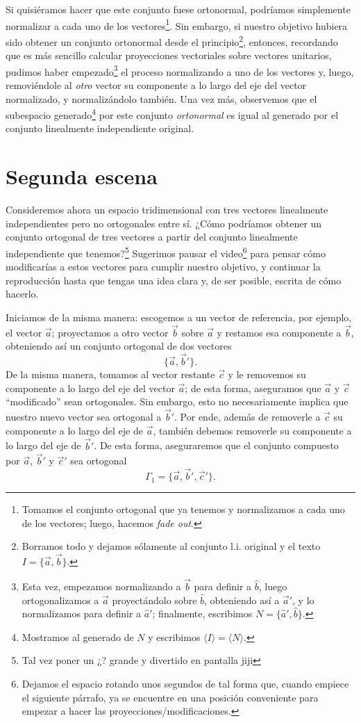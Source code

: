 \documentclass[12pt,dvipsnames]{article}
\numberwithin{equation}{section}
\begin{document}
Si quisiéramos hacer que este conjunto fuese ortonormal, podríamos simplemente normalizar a cada uno de los vectores\footnote{Tomamos el conjunto ortogonal que ya tenemos y normalizamos a cada uno de los vectores; luego, hacemos \emph{fade out}.}. Sin embargo, si nuestro objetivo hubiera sido obtener un conjunto ortonormal desde el principio\footnote{Borramos todo y dejamos sólamente al conjunto l.i. original y el texto $I=\{\vec{a},\vec{b}\}$.}, entonces, recordando que es más sencillo calcular proyecciones vectoriales sobre vectores unitarios, pudimos haber empezado\footnote{Esta vez, empezamos normalizando a $\vec{b}$ para definir a $\hat{b}$, luego ortogonalizamos a $\vec{a}$ proyectándolo sobre $\hat{b}$, obteniendo así a $\vec{a}'$, y lo normalizamos para definir a $\hat{a}'$; finalmente, escribimos $N=\{\hat{a}',\hat{b}\}$.} el proceso normalizando a uno de los vectores y, luego, removiéndole al \emph{otro} vector su componente a lo largo del eje del vector normalizado, y normalizándolo también. Una vez más, observemos que el subespacio generado\footnote{Mostramos al generado de $N$ y escribimos $\langle I\rangle=\langle N\rangle$.} por este conjunto \emph{ortonormal} es igual al generado por el conjunto linealmente independiente original.

\newpage
\section{Segunda escena}

Consideremos ahora un espacio tridimensional con tres vectores linealmente independientes pero no ortogonales entre sí. ¿Cómo podríamos obtener un conjunto ortogonal de tres vectores a partir del conjunto linealmente independiente que tenemos?\footnote{Tal vez poner un ¿? grande y divertido en pantalla jiji} Sugerimos pausar el video\footnote{Dejamos el espacio rotando unos segundos de tal forma que, cuando empiece el siguiente párrafo, ya se encuentre en una posición conveniente para empezar a hacer las proyecciones/modificaciones.} para pensar cómo modificarías a estos vectores para cumplir nuestro objetivo, y continuar la reproducción hasta que tengas una idea clara y, de ser posible, escrita de cómo hacerlo.

Iniciamos de la misma manera: escogemos a un vector de referencia, por ejemplo, el vector $\vec{a}$; proyectamos a otro vector $\vec{b}$ sobre $\vec{a}$ y restamos esa componente a $\vec{b}$, obteniendo así un conjunto ortogonal de dos vectores\[
\{\vec{a},\vec{b}'\}.
\] De la misma manera, tomamos al vector restante $\vec{c}$ y le removemos su componente a lo largo del eje del vector $\vec{a}$; de esta forma, aseguramos que $\vec{a}$ y $\vec{c}$ ``modificado'' sean ortogonales. Sin embargo, esto no necesariamente implica que nuestro nuevo vector sea ortogonal a $\vec{b}'$. Por ende, además de removerle a $\vec{c}$ su componente a lo largo del eje de $\vec{a}$, también debemos removerle su componente a lo largo del eje de $\vec{b}'$. De esta forma, aseguraremos que el conjunto compuesto por $\vec{a}$, $\vec{b}'$ y $\vec{c}'$ sea ortogonal \[
\Gamma_1 = \{\vec{a},\vec{b}',\vec{c}'\}.
\]
\end{document}

